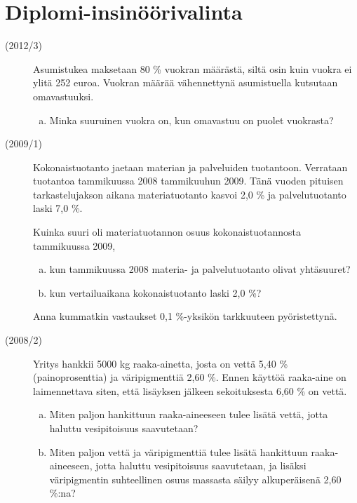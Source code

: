 \section{Diplomi-insinöörivalinta}
\begin{description}
	\item[(2012/3)] Asumistukea maksetaan 80 \% vuokran määrästä, siltä osin kuin
        vuokra ei ylitä 252 euroa. Vuokran määrää vähennettynä asumistuella
        kutsutaan omavastuuksi.
        
		\begin{enumerate}[(a)]
			\item Minka suuruinen vuokra on, kun omavastuu on puolet vuokrasta?
		\end{enumerate}
	
	\item[(2009/1)] Kokonaistuotanto jaetaan materian ja palveluiden tuotantoon.
        Verrataan tuotantoa tammikuussa 2008 tammikuuhun 2009. Tänä vuoden pituisen
        tarkastelujakson aikana materiatuotanto kasvoi 2,0 \% ja palvelutuotanto laski 7,0 \%.
	
	   Kuinka suuri oli materiatuotannon osuus kokonaistuotannosta tammikuussa 2009,
	   
    	\begin{enumerate}[(a)]
    		\item kun tammikuussa 2008 materia- ja palvelutuotanto olivat yhtäsuuret?
    		\item kun vertailuaikana kokonaistuotanto laski 2,0 \%?
    	\end{enumerate}
    	
	   Anna kummatkin vastaukset 0,1 \%-yksikön tarkkuuteen pyöristettynä.

	\item[(2008/2)] Yritys hankkii 5000 kg raaka-ainetta, josta on vettä 5,40 \%
        (painoprosenttia) ja väripigmenttiä 2,60 \%. Ennen käyttöä raaka-aine on
        laimennettava siten, että lisäyksen jälkeen sekoituksesta 6,60 \% on vettä.
	
    	\begin{enumerate}[(a)]
    		\item Miten paljon hankittuun raaka-aineeseen tulee lisätä vettä,
                jotta haluttu vesipitoisuus saavutetaan?
    		\item Miten paljon vettä ja väripigmenttiä tulee lisätä hankittuun
                raaka-aineeseen, jotta haluttu vesipitoisuus saavutetaan, ja lisäksi
                väripigmentin suhteellinen osuus massasta säilyy alkuperäisenä 2,60 \%:na?
    	\end{enumerate}
    	

\end{description}
